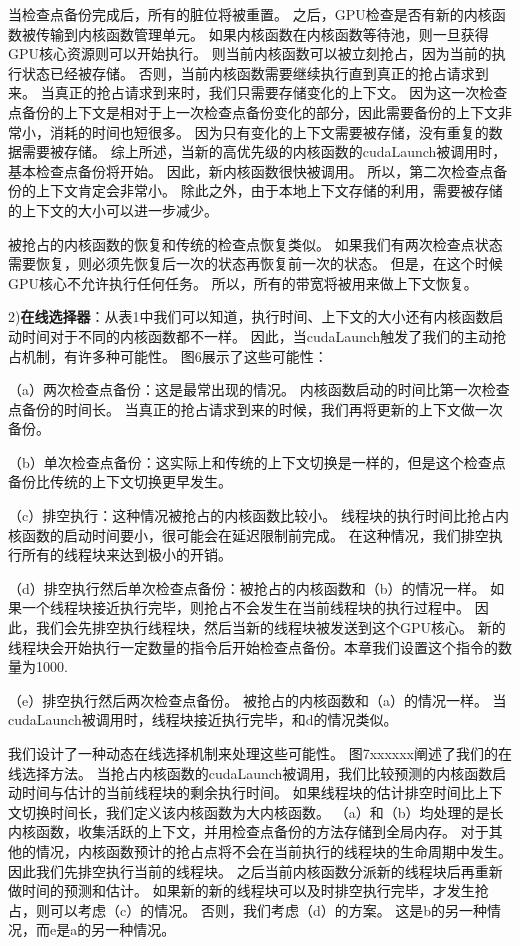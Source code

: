 当检查点备份完成后，所有的脏位将被重置。
之后，GPU检查是否有新的内核函数被传输到内核函数管理单元。
如果内核函数在内核函数等待池，则一旦获得GPU核心资源则可以开始执行。
则当前内核函数可以被立刻抢占，因为当前的执行状态已经被存储。
否则，当前内核函数需要继续执行直到真正的抢占请求到来。
当真正的抢占请求到来时，我们只需要存储变化的上下文。
因为这一次检查点备份的上下文是相对于上一次检查点备份变化的部分，因此需要备份的上下文非常小，消耗的时间也短很多。
因为只有变化的上下文需要被存储，没有重复的数据需要被存储。
综上所述，当新的高优先级的内核函数的cudaLaunch被调用时，基本检查点备份将开始。
因此，新内核函数很快被调用。
所以，第二次检查点备份的上下文肯定会非常小。
除此之外，由于本地上下文存储的利用，需要被存储的上下文的大小可以进一步减少。

被抢占的内核函数的恢复和传统的检查点恢复类似。
如果我们有两次检查点状态需要恢复，则必须先恢复后一次的状态再恢复前一次的状态。
但是，在这个时候GPU核心不允许执行任何任务。
所以，所有的带宽将被用来做上下文恢复。

2)\textbf{在线选择器}：从表1中我们可以知道，执行时间、上下文的大小还有内核函数启动时间对于不同的内核函数都不一样。
因此，当cudaLaunch触发了我们的主动抢占机制，有许多种可能性。
图6展示了这些可能性：

（a）两次检查点备份：这是最常出现的情况。
内核函数启动的时间比第一次检查点备份的时间长。
当真正的抢占请求到来的时候，我们再将更新的上下文做一次备份。

（b）单次检查点备份：这实际上和传统的上下文切换是一样的，但是这个检查点备份比传统的上下文切换更早发生。

（c）排空执行：这种情况被抢占的内核函数比较小。
线程块的执行时间比抢占内核函数的启动时间要小，很可能会在延迟限制前完成。
在这种情况，我们排空执行所有的线程块来达到极小的开销。

（d）排空执行然后单次检查点备份：被抢占的内核函数和（b）的情况一样。
如果一个线程块接近执行完毕，则抢占不会发生在当前线程块的执行过程中。
因此，我们会先排空执行线程块，然后当新的线程块被发送到这个GPU核心。
新的线程块会开始执行一定数量的指令后开始检查点备份。本章我们设置这个指令的数量为1000.

（e）排空执行然后两次检查点备份。
被抢占的内核函数和（a）的情况一样。
当cudaLaunch被调用时，线程块接近执行完毕，和d的情况类似。

我们设计了一种动态在线选择机制来处理这些可能性。
图7xxxxxx阐述了我们的在线选择方法。
当抢占内核函数的cudaLaunch被调用，我们比较预测的内核函数启动时间与估计的当前线程块的剩余执行时间。
如果线程块的估计排空时间比上下文切换时间长，我们定义该内核函数为大内核函数。
（a）和（b）均处理的是长内核函数，收集活跃的上下文，并用检查点备份的方法存储到全局内存。
对于其他的情况，内核函数预计的抢占点将不会在当前执行的线程块的生命周期中发生。
因此我们先排空执行当前的线程块。
之后当前内核函数分派新的线程块后再重新做时间的预测和估计。
如果新的新的线程块可以及时排空执行完毕，才发生抢占，则可以考虑（c）的情况。
否则，我们考虑（d）的方案。
这是b的另一种情况，而e是a的另一种情况。

